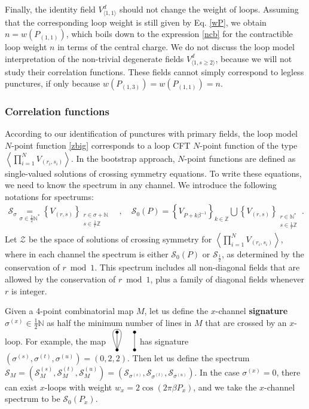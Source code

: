 \documentclass[12pt, a4paper]{article}
\newcommand{\myindex}[1]{\textbf{\boldmath #1}}
\newcommand{\vertices}{
\coordinate (base) at (0, 1);
\draw (0, 0) node[fill, circle, minimum size = 1.3mm, inner sep = 0]{};
  \draw (3, 0) node[fill, circle, minimum size = 1.3mm, inner sep = 0]{};
  \draw (0, 3) node[fill, circle, minimum size = 1.3mm, inner sep = 0]{};
  \draw (3, 3) node[fill, circle, minimum size = 1.3mm, inner sep = 0]{};
}
\theoremstyle{break}
\begin{document}
Finally, the identity field $V^d_{\langle 1,1\rangle}$ should not change the weight of loops. Assuming that 
the corresponding loop weight is still given by Eq. \eqref{wP}, we obtain 
$n=w(P_{(1,1)})$, which boils down to the expression \eqref{ncb} for the contractible loop weight $n$ in terms of the central charge. We do not discuss the loop model interpretation of the non-trivial degenerate fields $V^d_{\langle 1,s\geq 2\rangle}$, because we will not study their correlation functions. These fields cannot simply correspond to legless punctures, if only because $w(P_{(1,3)})=w(P_{(1,1)})=n$. 

\subsubsection{Correlation functions}\label{sec:cf}

According to our identification of punctures with primary fields, the loop model $N$-point function \eqref{zbig} corresponds to a loop CFT $N$-point function of the type $\left<\prod_{i=1}^N V_{(r_i,s_i)}\right>$. In the bootstrap approach, $N$-point functions are defined as single-valued solutions of crossing symmetry equations. To write these equations, we need to know the spectrum in any channel. We introduce the following notations for spectrums:
\begin{align}
 \mathcal{S}_{\sigma} \underset{\sigma\in \frac12\mathbb{N}^*}{=} \left\{V_{(r,s)}\right\}_{\substack{r\in \sigma+\mathbb{N} \\ s\in\frac{1}{r}\mathbb{Z}}} \quad , \quad \mathcal{S}_0(P) = \left\{V_{P+k\beta^{-1}}\right\}_{k\in\mathbb{Z}} \bigcup \left\{V_{(r,s)}\right\}_{\substack{r\in\mathbb{N}^* \\ s\in\frac{1}{r}\mathbb{Z}}}\ .
 \label{sxs}
\end{align}
Let $\mathcal{Z}$ be the space of solutions of crossing symmetry for $\left<\prod_{i=1}^N V_{(r_i,s_i)}\right>$, where in each channel the spectrum is either $\mathcal{S}_0(P)$ or $\mathcal{S}_\frac12$, as determined by the conservation of $r\bmod 1$. This spectrum includes all non-diagonal fields that are allowed by the conservation of $r\bmod 1$, plus a family of diagonal fields whenever $r$ is integer. 

Given a 4-point combinatorial map $M$, let us define the $x$-channel \myindex{signature} $\sigma^{(x)}\in\frac12\mathbb{N}$ as half the minimum number of lines in $M$ that are crossed by an $x$-loop. For example, the map 
$
\begin{tikzpicture}[baseline=(base), scale = .25]
 \vertices
  \draw (0, 0) -- (0, 3);
  \draw (3, 0) -- (3, 3);
  \draw (0, 0) to [out = 70, in = 0] (0, 3.5) to [out = 180, in = 110] (0, 0);
 \end{tikzpicture}
 $
has signature $(\sigma^{(s)},\sigma^{(t)},\sigma^{(u)})=(0,2,2)$. Then let us define the spectrum $\mathcal{S}_M = (\mathcal{S}^{(s)}_M, \mathcal{S}^{(t)}_M, \mathcal{S}^{(u)}_M)= (\mathcal{S}_{\sigma^{(s)}},\mathcal{S}_{\sigma^{(t)}},\mathcal{S}_{\sigma^{(u)}})$.
In the case $\sigma^{(x)}=0$, there can exist $x$-loops with weight $w_x=2\cos(2\pi\beta P_x)$, and we take the $x$-channel spectrum to be $\mathcal{S}_0(P_x)$. 
\end{document}
